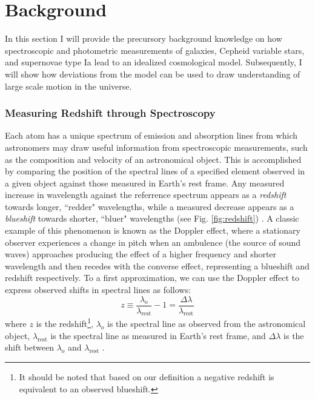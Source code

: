 \chapter{Background}


In this section I will provide the precursory background knowledge on how spectroscopic and photometric measurements of galaxies, Cepheid variable stars, and supernovae type Ia lead to an idealized cosmological model. Subsequently, I will show how deviations from the model can be used to draw understanding of large scale motion in the universe.

\subsection{Measuring Redshift through Spectroscopy}



Each atom has a unique spectrum of emission and absorption lines from which astronomers may draw useful information from spectroscopic measurements, such as the composition and velocity of an astronomical object. This is accomplished by comparing the position of the spectral lines of a specified element observed in a given object against those measured in Earth's rest frame. Any measured increase in wavelength against the referrence spectrum appears as a \textit{redshift} towards longer, ``redder" wavelengths, while a measured decrease appears as a \textit{blueshift} towards shorter, ``bluer" wavelengths (see Fig. \ref{fig:redshift}) \cite{SpectralRedshift}. A classic example of this phenomenon is known as the Doppler effect, where a stationary observer experiences a change in pitch when an ambulence (the source of sound waves) approaches producing the effect of a higher frequency and shorter wavelength and then recedes with the converse effect, representing a blueshift and redshift respectively. To a first approximation, we can use the Doppler effect to express observed shifts in spectral lines as follows:
%
\begin{equation}\label{ds}
z \equiv \frac{\lambda_{o}}{\lambda_\text{rest}} -1 = \frac{\Delta \lambda}{\lambda_\text{rest}}
\end{equation}
%
where $z$ is the redshift\footnote{It should be noted that based on our definition a negative redshift is equivalent to an observed blueshift.}, $\lambda_{o}$ is the spectral line as observed from the astronomical object, $\lambda_\text{rest}$ is the spectral line as measured in Earth's rest frame, and $\Delta \lambda$ is the shift between $\lambda_{o}$ and $\lambda_\text{rest}$ \cite{Hogg1999:DistanceMeas+GenRef,moore2012:general}.

